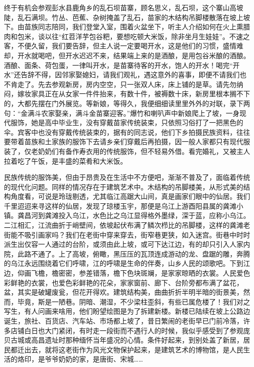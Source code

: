 \documentclass{article}
\begin{document}
终于有机会参观彭水县鹿角乡的乱石坝苗寨，顾名思义，乱石坝，这个寨山高坡陡，乱石满坝。竹丛、芭蕉、杂树掩盖了乱石，苗家的木结构吊脚楼散落在坡上坡下。由苗族同志陪同，我们登堂入室，围着火盆坐下，听主人介绍如何在火上熏腊肉和包米，谈以往“红苕洋芋包谷粑，要想吃顿大米饭，除非坐月生娃娃”。不速之客，不便久留，我们要告辞，但主人说一定要喝开水，这是他们的习惯，盛情难却，开水就喝吧，但开水迟迟不来，结果端上来的是酒酿，是用包谷米酿的酒酿。酒酿、面条、荷包蛋，一律叫开水，是苗寨待客的开水，饱人的开水！喝完“开水”还告辞不得，因邻家娶媳妇，请我们观礼，遇这意外的喜事，即便不请我们也不肯走了。先去参观新房，房内空空，只一张双人床，床上铺的是草。请先勿纳闷，嫁妆家具正在从女家一件件抬来，有数十件，被褥数十床，新房里根本搁不下的，大都先摆在门外展览。等新娘，等得久，我便细细读里里外外的对联，录下两句：“金满斗农家娶亲，满斗金苗寨迎客。”爆竹和喇叭声中新娘爬上了坡，一身现代服饰，她是高中毕业生，没有穿戴苗家传统装束，只依照习俗打了一把黑色的伞。宾客中也没有穿戴传统装束的，据有的同志说，他们下乡拍摄民族资料，往往要带着苗族和土家族的服饰下去请乡亲们穿戴后再拍摄，因一般人家都只有现代服装了，仅老奶奶们有备作寿衣用的传统服饰，但不轻易外借。看完婚礼，又被主人拉着吃了午饭，是丰盛的菜肴和大米饭。

民族传统的服饰美，但由于昂贵及在生活中不方便吧，渐渐不普及了，面临着传统的现代化问题。同样的情况存在于建筑艺术中。木结构的吊脚楼美，从形式美的结构角度看，可说是玲珑剔透，尤其临江高踞大山间，真是画家们眼中的仙居。我们千里迢迢来寻这样的仙居，发现了琼楼玉宇，那便是乌江上游酉阳县属的龚滩小镇。龚昌河到龚滩投入乌江，水色比之乌江显得格外墨绿，深于蓝，应称小乌江。二江相汇，江流曲折于峭壁间，依坡起伏布满了鳞次栉比的吊脚楼，这样的龚滩老街能不吸引画家吗？我们在老街中穿来穿去，街窄巷更狭，如入迷宫。街巷中时时派生出仅容一人通过的台阶，或须由此上坡，或可下达江边，有的却只引入人家内院，此路不通了。上了高坡，俯瞰，黑压压的瓦顶连成游动的龙、盘踞的雕，奔腾的乌江永远围绕着它们呼啸，江的呼啸是生命的伴奏，山乡人民的颂歌吧。下到江边，仰画飞檐，檐密密，参差错落，檐下色块斑斓，是家家晾晒的衣裳。人民爱色彩鲜艳的衣裳，也爱色彩鲜艳的花朵，家家窗前、廊下、台阶旁都布满了盆花，盆，其实是破罐废瓮，但花开得欢。建筑结构美，曲曲折折半明半暗的街景美，然而，毕竟，斯是一陋巷。阴暗、潮湿，不少梁柱歪斜，有些已属危楼了！我们对之写生，有人问画来啥用，他们盼望绘图是为了拆建新楼。新楼已陆续在坡上公路边诞生，旅社、百货店、汽车站、市场都上坡了，昔日繁闹的老街早已门前冷落，许多店铺白日也大门紧闭，有时走一段街而不遇行人的时候，我似乎感受到了参观庞贝古城或高昌遗址时那种缅怀当年盛况的心情。条件好起来，到别处盖了新居，居民都迁出去，就将这老街作为风光文物保护起来，是建筑艺术的博物馆，是人民生活的烙印，是爷爷奶奶的家，是唐街、宋城……
\end{document}
